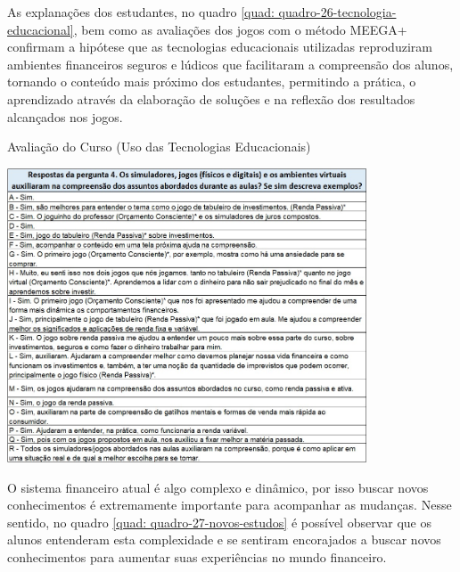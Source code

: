 As explanações dos estudantes, no quadro \ref{quad: quadro-26-tecnologia-educacional}, bem como as avaliações dos jogos com o método MEEGA+ confirmam a hipótese que as tecnologias educacionais utilizadas reproduziram ambientes financeiros seguros e lúdicos que facilitaram a compreensão dos alunos, tornando o conteúdo mais próximo dos estudantes, permitindo a prática, o aprendizado através da elaboração de soluções e na reflexão dos resultados alcançados nos jogos.

\graphicspath{{quadros/}} 
\begin{quadro}[!ht]
\centering
\begin{minipage}{0.80\textwidth}
\caption{Avaliação do Curso (Uso das Tecnologias Educacionais)}
\centering
\includegraphics[width=0.80\textwidth]{quadro-26-tecnologia-educacional}
\label{quad: quadro-26-tecnologia-educacional}
\end{minipage}
\end{quadro}

O sistema financeiro atual é algo complexo e dinâmico, por isso buscar novos conhecimentos é extremamente importante para acompanhar as mudanças. Nesse sentido, no quadro \ref{quad: quadro-27-novos-estudos} é possível observar que os alunos entenderam esta complexidade e se sentiram encorajados a buscar novos conhecimentos para aumentar suas experiências no mundo financeiro.

